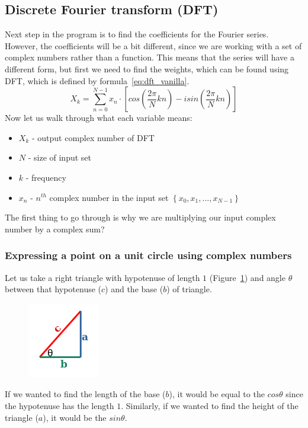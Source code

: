 \documentclass[titlepage]{article}
\begin{document}
\subsection{Discrete Fourier transform (DFT)}

    Next step in the program is to find the coefficients for the Fourier series.
    However, the coefficients will be a bit different, since we are working with 
    a set of complex numbers rather than a function. This means that the series
    will have a different form, but first we need to find the weights, which can
    be found using DFT, which is defined by formula~\eqref{eq:dft_vanilla}.
    \begin{equation}\label{eq:dft_vanilla}
        X_k = \sum_{n=0}^{N-1}x_n \cdot \left[cos\left(\frac{2\pi}{N}kn\right) - 
        isin\left(\frac{2\pi}{N}kn\right)\right]
    \end{equation}
    Now let us walk through what each variable means:
    \begin{itemize}
        \item $X_k$ - output complex number of DFT
        \item $N$ - size of input set
        \item $k$ - frequency
        \item $x_n$ - $n^{th}$ complex number in the input set $\left\{x_0, x_1,
            ..., x_{N-1} \right\}$
    \end{itemize}
    
    The first thing to go through is why we are multiplying our input complex 
    number by a complex sum?

\subsubsection{Expressing a point on a unit circle using complex numbers}

    Let us take a right triangle with hypotenuse of length $1$
    (Figure~\ref{fig:right_triangle})
    and angle $\theta$ between that hypotenuse ($c$) and the base ($b$) of triangle.
    \begin{figure}[H]
        \caption{}
        \centering
        \includegraphics[width=0.2\linewidth]{right_triangle}
        \label{fig:right_triangle}
    \end{figure}
    If we wanted to find the length of the base ($b$), it would be equal
    to the $cos\theta$ since the hypotenuse has the length $1$. Similarly, if we
    wanted to find the height of the triangle ($a$), it would be the $sin\theta$.
\end{document}
